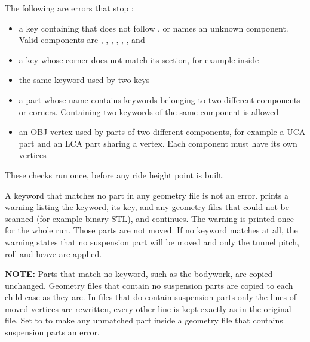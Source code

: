 The following are errors that stop :
\begin{itemize}
    \item a key containing  that does not follow , or names an unknown component. Valid components are , , , , , ,  and 
    \item a key whose corner does not match its section, for example  inside \codeword{[SUSP_FL]}
    \item the same keyword used by two keys
    \item a part whose name contains keywords belonging to two different components or corners. Containing two keywords of the same component is allowed
    \item an OBJ vertex used by parts of two different components, for example a UCA part and an LCA part sharing a vertex. Each component must have its own vertices
\end{itemize}

These checks run once, before any ride height point is built.

A keyword that matches no part in any geometry file is not an error.  prints a warning listing the keyword, its key, and any geometry files that could not be scanned (for example binary STL), and continues. The warning is printed once for the whole run. Those parts are not moved. If no keyword matches at all, the warning states that no suspension part will be moved and only the tunnel pitch, roll and heave are applied.

\textbf{NOTE:} Parts that match no keyword, such as the bodywork, are copied unchanged. Geometry files that contain no suspension parts are copied to each child case as they are. In files that do contain suspension parts only the lines of moved vertices are rewritten, every other line is kept exactly as in the original file. Set  to  to make any unmatched part inside a geometry file that contains suspension parts an error.

